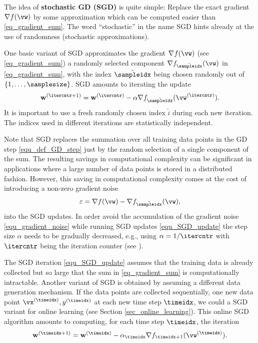 \documentclass[12pt]{report}
\begin{document}
The idea of {\bf stochastic GD (SGD)} is quite simple: Replace the exact gradient $\nabla f(\vw)$ 
by some approximation which can be computed easier than \eqref{eq_gradient_sum}. The word ``stochastic'' 
in the name SGD hints already at the use of randomness (stochastic approximations). 

One basic variant of SGD approximates the gradient $\nabla f(\vw)$ (see \eqref{eq_gradient_sum}) 
a randomly selected component $\nabla f_{\hat{\sampleidx}}(\vw)$ in \eqref{eq_gradient_sum}, 
with the index $\hat{\sampleidx}$ being chosen randomly out of $\{1,\ldots,\samplesize\}$. SGD 
amounts to iterating the update 
\begin{equation}
\label{equ_SGD_update}
\mathbf{w}^{(\itercntr+1)} = \mathbf{w}^{(\itercntr)} - \alpha \nabla f_{\hat{\sampleidx}}(\vw^{(\itercntr)}).
\end{equation} 
It is important to use a fresh randomly chosen index $\hat{i}$ during each new iteration. 
The indices used in different iterations are statistically independent. 

Note that SGD replaces the summation over all training data points in the GD step 
\eqref{equ_def_GD_step} just by the random selection of a single component of the sum. 
The resulting savings in computational complexity can be significant in applications 
where a large number of  data points is stored in a distributed fashion. However, this 
saving in computational complexity comes at the cost of introducing a non-zero 
gradient noise 
\begin{equation}
\label{equ_gradient_noise}
\varepsilon = \nabla f(\vw)  - \nabla f_{\hat{\sampleidx}}(\vw), 
\end{equation} 
into the SGD updates. In order avoid the accumulation of the gradient noise \eqref{equ_gradient_noise} 
while running SGD updates \eqref{equ_SGD_update} the step size $\alpha$ needs to be gradually 
decreased, e.g., using $\alpha = 1/\itercntr$ with $\itercntr$ being the iteration counter (see \cite{Murata98astatistical}). 

The SGD iteration \eqref{equ_SGD_update} assumes that the training data is already 
collected but so large that the sum in \eqref{eq_gradient_sum} is computationally intractable. 
Another variant of SGD is obtained by assuming a different data generation 
mechanism. If the data points are collected sequentially, one new data point $\vx^{(\timeidx)},y^{(\timeidx)}$ 
at each new time step $\timeidx$, we could a SGD variant for online learning 
(see Section \ref{sec_online_learning}). This online SGD algorithm amounts to 
computing, for each time step $\timeidx$, the iteration 
\begin{equation}
\label{equ_SGD_update_timeiedx}
\mathbf{w}^{(\timeidx+1)} = \mathbf{w}^{(\timeidx)} - \alpha_{\timeidx} \nabla f_{\timeidx+1}(\vw^{(\timeidx)}).
\end{equation} 
\end{document}
